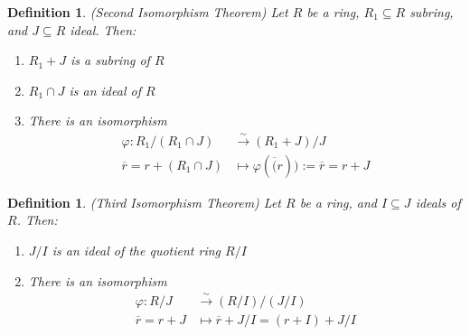 \documentclass[a4paper,8pt]{article}
\newcommand{\isomorp}{\xrightarrow{\sim}}
\newcommand{\hlt}[1]{\textit{{\color{blue}#1}}}
\theoremstyle{theorem}
\newtheorem{definition}[theorem]{Definition}
\begin{document}
\begin{definition}
\hlt{(Second Isomorphism Theorem)} Let $R$ be a ring, $R_1 \subseteq R$ subring, and $J \subseteq R$ ideal. Then:
\begin{enumerate}[label=(\roman*)]
\item $R_1 + J$ is a subring of $R$
\item $R_1 \cap J$ is an ideal of $R$
\item There is an isomorphism 
\begin{align}
\varphi: R_1/(R_1 \cap J) &\isomorp (R_1 + J)/J \nonumber \\
\overline{r} = r + (R_1 \cap J) &\mapsto \varphi(\overline(r)) := \overline{r} = r+J \nonumber
\end{align}
\end{enumerate}
\end{definition}


\begin{definition}
\hlt{(Third Isomorphism Theorem)} Let $R$ be a ring, and $I \subseteq J$ ideals of $R$. Then: 
\begin{enumerate}[label=(\roman*)]
\item $J/I$ is an ideal of the quotient ring $R/I$
\item There is an isomorphism
\begin{align}
\varphi: R/J &\isomorp (R/I)/(J/I) \nonumber \\
\overline{r}=r+J &\mapsto \overline{r} + J/I = (r+I) + J/I \nonumber
\end{align}
\end{enumerate}
\end{definition}
\end{document}
